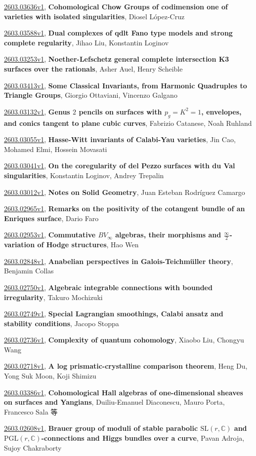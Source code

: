 \documentclass[9pt, a4paper]{article}
\theoremstyle{plain}
\theoremstyle{definition}
\theoremstyle{remark}
\newcommand{\arxiv}[3]{\href{https://arxiv.org/abs/#1}{#1}, \textbf{\textcolor{arxivblue}{#2}}, #3}
\begin{document}
\arxiv{2603.03636v1}{Cohomological Chow Groups of codimension one of varieties with isolated singularities}{Diosel López-Cruz}

\arxiv{2603.03588v1}{Dual complexes of qdlt Fano type models and strong complete regularity}{Jihao Liu, Konstantin Loginov}

\arxiv{2603.03253v1}{Noether-Lefschetz general complete intersection K3 surfaces over the rationals}{Asher Auel, Henry Scheible}

\arxiv{2603.03413v1}{Some Classical Invariants, from Harmonic Quadruples to Triangle Groups}{Giorgio Ottaviani, Vincenzo Galgano}

\arxiv{2603.03132v1}{Genus $2$ pencils on surfaces with $p_g=K^2=1$, envelopes, and conics tangent to plane cubic curves}{Fabrizio Catanese, Noah Ruhland}

\arxiv{2603.03055v1}{Hasse-Witt invariants of Calabi-Yau varieties}{Jin Cao, Mohamed Elmi, Hossein Movasati}

\arxiv{2603.03041v1}{On the coregularity of del Pezzo surfaces with du Val singularities}{Konstantin Loginov, Andrey Trepalin}

\arxiv{2603.03012v1}{Notes on Solid Geometry}{Juan Esteban Rodríguez Camargo}

\arxiv{2603.02965v1}{Remarks on the positivity of the cotangent bundle of an Enriques surface}{Dario Faro}

\arxiv{2603.02953v1}{Commutative $BV_\infty$ algebras, their morphisms and $\frac{\infty}{2}$-variation of Hodge structures}{Hao Wen}

\arxiv{2603.02848v1}{Anabelian perspectives in Galois-Teichmüller theory}{Benjamin Collas}

\arxiv{2603.02750v1}{Algebraic integrable connections with bounded irregularity}{Takuro Mochizuki}

\arxiv{2603.02749v1}{Special Lagrangian smoothings, Calabi ansatz and stability conditions}{Jacopo Stoppa}

\arxiv{2603.02736v1}{Complexity of quantum cohomology}{Xiaobo Liu, Chongyu Wang}

\arxiv{2603.02718v1}{A log prismatic-crystalline comparison theorem}{Heng Du, Yong Suk Moon, Koji Shimizu}

\arxiv{2603.03386v1}{Cohomological Hall algebras of one-dimensional sheaves on surfaces and Yangians}{Duiliu-Emanuel Diaconescu, Mauro Porta, Francesco Sala 等}

\arxiv{2603.02608v1}{Brauer group of moduli of stable parabolic $\text{SL}(r,\mathbb{C})$ and $\text{PGL}(r,\mathbb{C})$-connections and Higgs bundles over a curve}{Pavan Adroja, Sujoy Chakraborty}
\end{document}
